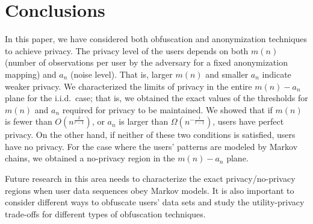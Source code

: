 \section{Conclusions}
In this paper, we have considered both obfuscation and anonymization techniques to achieve privacy.  The privacy level of the users depends on both $m(n)$ (number of observations per user by the adversary for a fixed anonymization mapping) and $a_n$ (noise level). That is, larger $m(n)$ and smaller $a_n$ indicate weaker privacy.  We characterized the limits of privacy in the entire $m(n)-a_n$ plane for the i.i.d.\ case; that is, we obtained the exact values of the thresholds for $m(n)$ and $a_n$ required for privacy to be maintained.  We showed that if $m(n)$ is fewer than $O\left(n^{\frac{2}{r-1}}\right)$, or $a_n$ is larger than $\Omega\left(n^{-\frac{1}{r-1}}\right)$, users have perfect privacy. On the other hand, if neither of these two conditions is satisfied, users have no privacy. For the case where the users' patterns are modeled by Markov chains, we obtained a no-privacy region in the $m(n)-a_n$ plane.

Future research in this area needs to characterize the exact privacy/no-privacy regions when user data sequences obey Markov models. It is also important to consider different ways to obfuscate users' data sets and study the utility-privacy trade-offs for different types of obfuscation techniques.

